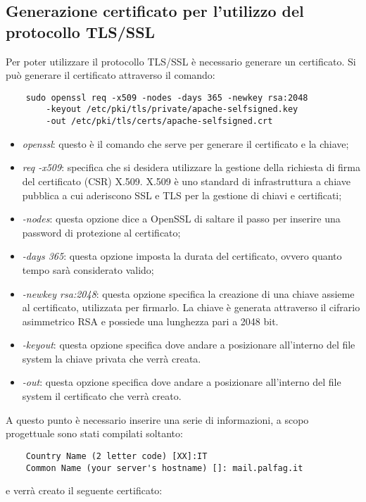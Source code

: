\subsection{Generazione certificato per l'utilizzo del protocollo TLS/SSL}
Per poter utilizzare il protocollo TLS/SSL è necessario generare un certificato\cite{certs}.
Si può generare il certificato attraverso il comando:

\begin{verbatim}
    sudo openssl req -x509 -nodes -days 365 -newkey rsa:2048 
        -keyout /etc/pki/tls/private/apache-selfsigned.key 
        -out /etc/pki/tls/certs/apache-selfsigned.crt
\end{verbatim}

\begin{itemize}
    \item \textit{openssl}: questo è il comando che serve per generare il certificato e la chiave;
    \item \textit{req -x509}: specifica che si desidera utilizzare la gestione della richiesta di firma del certificato 
    (CSR) X.509. X.509 è uno standard di infrastruttura a chiave pubblica a cui aderiscono SSL e TLS per la gestione 
    di chiavi e certificati;
    \item \textit{-nodes}: questa opzione dice a OpenSSL di saltare il passo per inserire una password di protezione al certificato;
    \item \textit{-days 365}: questa opzione imposta la durata del certificato, ovvero quanto tempo sarà considerato
    valido;
    \item \textit{-newkey rsa:2048}: questa opzione specifica la creazione di una chiave assieme al certificato, 
    utilizzata per firmarlo. La chiave è generata attraverso il cifrario asimmetrico RSA 
    e possiede una lunghezza pari a 2048 bit.
    \item \textit{-keyout}: questa opzione specifica dove andare a posizionare all’interno del 
    file system la chiave privata che verrà creata.
    \item \textit{-out}: questa opzione specifica dove andare a posizionare all’interno del file system il certificato che verrà creato.
\end{itemize}
A questo punto è necessario inserire una serie di informazioni, a scopo progettuale sono stati compilati soltanto:

\begin{verbatim}
    Country Name (2 letter code) [XX]:IT
    Common Name (your server's hostname) []: mail.palfag.it
\end{verbatim}
e verrà creato il seguente certificato:


